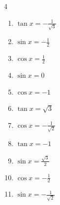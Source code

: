 \begin{multicols}{4}
\begin{enumerate}
  \item $\displaystyle \tan{x}  = -\frac{1}{\sqrt{3}}$


\columnbreak %

  \item $\displaystyle \sin{x}  = -\frac{1}{2}$


  \item $\displaystyle \cos{x}  = \frac{1}{2}$


  \item $\displaystyle \sin{x}  = 0$

        \phantom{$\displaystyle x = 0 , \pi$}

  \item $\displaystyle \cos{x}  = -1$

        \phantom{$\displaystyle x = \pi$}

  \item $\displaystyle \tan{x}  = \sqrt{3}$


  \item $\displaystyle \cos{x}  = -\frac{1}{\sqrt{2}}$


  \item $\displaystyle \tan{x}  = -1$


  \item $\displaystyle \sin{x}  = \frac{\sqrt{3}}{2}$


  \item $\displaystyle \cos{x}  = -\frac{1}{2}$


  \item $\displaystyle \sin{x}  = -\frac{1}{\sqrt{2}}$



\end{enumerate}
\end{multicols}
